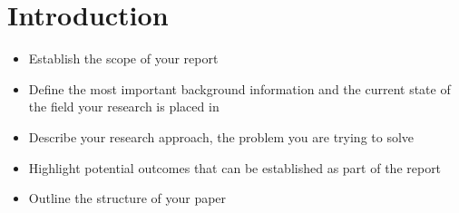 \section{Introduction}

\begin{itemize}
	\item Establish the scope of your report
	\item Define the most important background information and the current state of the field your research is placed in
	\item Describe your research approach, the problem you are trying to solve
	\item Highlight potential outcomes that can be established as part of the report
	\item Outline the structure of your paper
\end{itemize}
